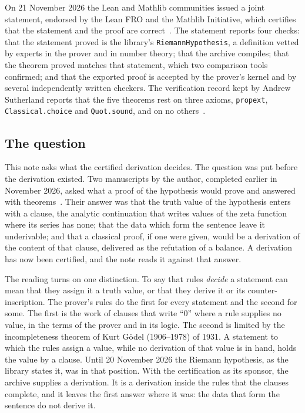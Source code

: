\documentclass[11pt]{article}
\theoremstyle{definition}
\theoremstyle{remark}
\DeclareRobustCommand{\lean}[1]{{\renewcommand{\_}{\textunderscore\allowbreak}\texttt{#1}}}
\begin{document}
On 21 November 2026 the Lean and Mathlib communities issued a joint statement, endorsed by the Lean FRO and the Mathlib Initiative, which certifies that the statement and the proof are correct~\citep{leanblog}. The statement reports four checks: that the statement proved is the library's \lean{RiemannHypothesis}, a definition vetted by experts in the prover and in number theory; that the archive compiles; that the theorem proved matches that statement, which two comparison tools confirmed; and that the exported proof is accepted by the prover's kernel and by several independently written checkers. The verification record kept by Andrew Sutherland reports that the five theorems rest on three axioms, \lean{propext}, \lean{Classical.choice} and \lean{Quot.sound}, and on no others~\citep{sutherland}.

\subsection{The question}

This note asks what the certified derivation decides. The question was put before the derivation existed. Two manuscripts by the author, completed earlier in November 2026, asked what a proof of the hypothesis would prove and answered with theorems~\citep{tv,rhp}. Their answer was that the truth value of the hypothesis enters with a clause, the analytic continuation that writes values of the zeta function where its series has none; that the data which form the sentence leave it underivable; and that a classical proof, if one were given, would be a derivation of the content of that clause, delivered as the refutation of a balance. A derivation has now been certified, and the note reads it against that answer.

The reading turns on one distinction. To say that rules \emph{decide} a statement can mean that they assign it a truth value, or that they derive it or its counter-inscription. The prover's rules do the first for every statement and the second for some. The first is the work of clauses that write ``0'' where a rule supplies no value, in the terms of the prover and in its logic. The second is limited by the incompleteness theorem of Kurt G\"odel (1906--1978) of 1931. A statement to which the rules assign a value, while no derivation of that value is in hand, holds the value by a clause. Until 20 November 2026 the Riemann hypothesis, as the library states it, was in that position. With the certification as its sponsor, the archive supplies a derivation. It is a derivation inside the rules that the clauses complete, and it leaves the first answer where it was: the data that form the sentence do not derive it.
\end{document}
